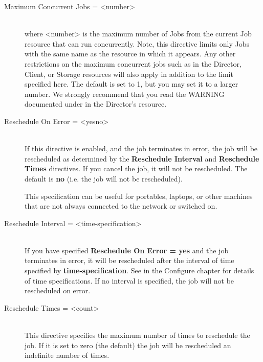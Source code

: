 \begin{description}
\item [Maximum Concurrent Jobs = {\textless}number{\textgreater}] \hfill \\
where {\textless}number{\textgreater} is the maximum number of Jobs from the current
Job resource that can run concurrently.  Note, this directive limits
only Jobs with the same name as the resource in which it appears.  Any
other restrictions on the maximum concurrent jobs such as in the
Director, Client, or Storage resources will also apply in addition to
the limit specified here.  The default is set to 1, but you may set it
to a larger number.  We strongly recommend that you read the WARNING
documented under  in the
Director's resource.

\item [Reschedule On Error = {\textless}yes{\textbar}no{\textgreater}] \hfill \\
If this directive is enabled, and the job terminates in error, the job
will be rescheduled as determined by the {\bf Reschedule Interval} and
{\bf Reschedule Times} directives.  If you cancel the job, it will not
be rescheduled.  The default is {\bf no} (i.e.  the job will not be
rescheduled).

This specification can be useful for portables, laptops, or other
machines that are not always connected to the network or switched on.

\item [Reschedule Interval = {\textless}time-specification{\textgreater}] \hfill \\
If you have specified {\bf Reschedule On Error = yes} and the job
terminates in error, it will be rescheduled after the interval of time
specified by {\bf time-specification}.  See  in the Configure chapter for details of
time specifications.  If no interval is specified, the job will not be
rescheduled on error.

\item [Reschedule Times = {\textless}count{\textgreater}] \hfill \\
This directive specifies the maximum number of times to reschedule the
job.  If it is set to zero (the default) the job will be rescheduled an
indefinite number of times.


\end{description}
